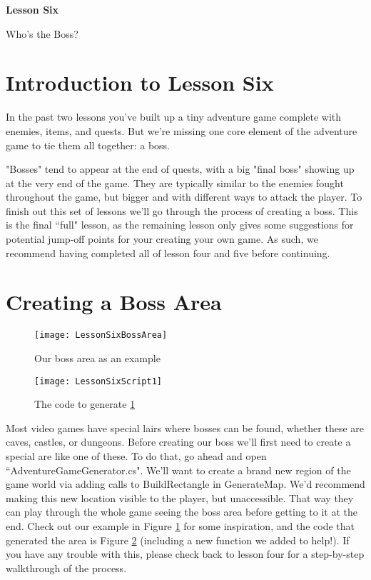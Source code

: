 \documentclass{article}
\begin{document}
\vspace*{\fill}
\begin{center}
{\Huge\bf Lesson Six}

\vspace{2\baselineskip}

{\huge Who's the Boss?}
\end{center}
\vspace*{\fill}
\newpage


\section{Introduction to Lesson Six}

In the past two lessons you've built up a tiny adventure game complete with enemies, items, and quests. But we're missing one core element of the adventure game to tie them all together: a boss. 

"Bosses" tend to appear at the end of quests, with a big "final boss" showing up at the very end of the game. They are typically similar to the enemies fought throughout the game, but bigger and with different ways to attack the player. To finish out this set of lessons we'll go through the process of creating a boss. This is the final ``full" lesson, as the remaining lesson only gives some suggestions for potential jump-off points for your creating your own game. As such, we recommend having completed all of lesson four and five before continuing. 

\section{Creating a Boss Area}

\begin{figure}
  \texttt{[image: LessonSixBossArea]}
  \caption{Our boss area as an example}
  \label{fig:LessonSixBossArea}
\end{figure}
\begin{figure}
  \texttt{[image: LessonSixScript1]}
  \caption{The code to generate \ref{fig:LessonSixBossArea}}
  \label{fig:LessonSixScript1}
\end{figure}

Most video games have special lairs where bosses can be found, whether these are caves, castles, or dungeons. Before creating our boss we'll first need to create a special are like one of these. To do that, go ahead and open ``AdventureGameGenerator.cs". We'll want to create a brand new region of the game world via adding calls to BuildRectangle in GenerateMap. We'd recommend making this new location visible to the player, but unaccessible. That way they can play through the whole game seeing the boss area before getting to it at the end. Check out our example in Figure \ref{fig:LessonSixBossArea} for some inspiration, and the code that generated the area is Figure \ref{fig:LessonSixScript1} (including a new function we added to help!). If you have any trouble with this, please check back to lesson four for a step-by-step walkthrough of the process.
\end{document}
